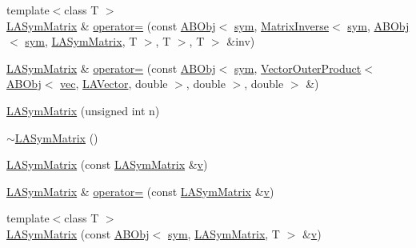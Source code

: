 \begin{DoxyCompactItemize}
\item 
{\footnotesize template$<$class T $>$ }\\\mbox{\hyperlink{classROOT_1_1Minuit2_1_1LASymMatrix}{L\+A\+Sym\+Matrix}} \& \mbox{\hyperlink{classROOT_1_1Minuit2_1_1LASymMatrix_a95fd77b55f726095a231817852fceb7d}{operator=}} (const \mbox{\hyperlink{classROOT_1_1Minuit2_1_1ABObj}{A\+B\+Obj}}$<$ \mbox{\hyperlink{classROOT_1_1Minuit2_1_1sym}{sym}}, \mbox{\hyperlink{classROOT_1_1Minuit2_1_1MatrixInverse}{Matrix\+Inverse}}$<$ \mbox{\hyperlink{classROOT_1_1Minuit2_1_1sym}{sym}}, \mbox{\hyperlink{classROOT_1_1Minuit2_1_1ABObj}{A\+B\+Obj}}$<$ \mbox{\hyperlink{classROOT_1_1Minuit2_1_1sym}{sym}}, \mbox{\hyperlink{classROOT_1_1Minuit2_1_1LASymMatrix}{L\+A\+Sym\+Matrix}}, T $>$, T $>$, T $>$ \&inv)
\item 
\mbox{\hyperlink{classROOT_1_1Minuit2_1_1LASymMatrix}{L\+A\+Sym\+Matrix}} \& \mbox{\hyperlink{classROOT_1_1Minuit2_1_1LASymMatrix_a6d385d24fe98b336532837ad39f5c615}{operator=}} (const \mbox{\hyperlink{classROOT_1_1Minuit2_1_1ABObj}{A\+B\+Obj}}$<$ \mbox{\hyperlink{classROOT_1_1Minuit2_1_1sym}{sym}}, \mbox{\hyperlink{classROOT_1_1Minuit2_1_1VectorOuterProduct}{Vector\+Outer\+Product}}$<$ \mbox{\hyperlink{classROOT_1_1Minuit2_1_1ABObj}{A\+B\+Obj}}$<$ \mbox{\hyperlink{classROOT_1_1Minuit2_1_1vec}{vec}}, \mbox{\hyperlink{classROOT_1_1Minuit2_1_1LAVector}{L\+A\+Vector}}, double $>$, double $>$, double $>$ \&)
\item 
\mbox{\hyperlink{classROOT_1_1Minuit2_1_1LASymMatrix_a9fe58788095d0860bb44bde53457782c}{L\+A\+Sym\+Matrix}} (unsigned int n)
\item 
\mbox{\hyperlink{classROOT_1_1Minuit2_1_1LASymMatrix_a6de4c2f5940002a13411348985d1b784}{$\sim$\+L\+A\+Sym\+Matrix}} ()
\item 
\mbox{\hyperlink{classROOT_1_1Minuit2_1_1LASymMatrix_ac74006982da0bcda789c1237e0022033}{L\+A\+Sym\+Matrix}} (const \mbox{\hyperlink{classROOT_1_1Minuit2_1_1LASymMatrix}{L\+A\+Sym\+Matrix}} \&\mbox{\hyperlink{hadron__timeslice_8cc_a716fc87f5e814be3ceee2405ed6ff22a}{v}})
\item 
\mbox{\hyperlink{classROOT_1_1Minuit2_1_1LASymMatrix}{L\+A\+Sym\+Matrix}} \& \mbox{\hyperlink{classROOT_1_1Minuit2_1_1LASymMatrix_a31521afba8179a28e7744af51850922e}{operator=}} (const \mbox{\hyperlink{classROOT_1_1Minuit2_1_1LASymMatrix}{L\+A\+Sym\+Matrix}} \&\mbox{\hyperlink{hadron__timeslice_8cc_a716fc87f5e814be3ceee2405ed6ff22a}{v}})
\item 
{\footnotesize template$<$class T $>$ }\\\mbox{\hyperlink{classROOT_1_1Minuit2_1_1LASymMatrix_ab44b18a4c1b65cb054c884661843a4a0}{L\+A\+Sym\+Matrix}} (const \mbox{\hyperlink{classROOT_1_1Minuit2_1_1ABObj}{A\+B\+Obj}}$<$ \mbox{\hyperlink{classROOT_1_1Minuit2_1_1sym}{sym}}, \mbox{\hyperlink{classROOT_1_1Minuit2_1_1LASymMatrix}{L\+A\+Sym\+Matrix}}, T $>$ \&\mbox{\hyperlink{hadron__timeslice_8cc_a716fc87f5e814be3ceee2405ed6ff22a}{v}})

\end{DoxyCompactItemize}
